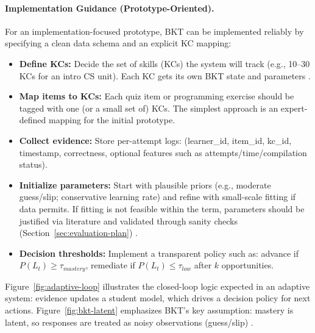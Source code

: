 \documentclass{article}
\begin{document}
\paragraph{Implementation Guidance (Prototype-Oriented).}
For an implementation-focused prototype, BKT can be implemented reliably by specifying a clean data schema
and an explicit KC mapping:
\begin{itemize}
    \item \textbf{Define KCs:} Decide the set of skills (KCs) the system will track (e.g., 10--30 KCs for an
    intro CS unit). Each KC gets its own BKT state and parameters \cite{corbett1995}.
    \item \textbf{Map items to KCs:} Each quiz item or programming exercise should be tagged with one (or a small
    set of) KCs. The simplest approach is an expert-defined mapping for the initial prototype.
    \item \textbf{Collect evidence:} Store per-attempt logs: (learner\_id, item\_id, kc\_id, timestamp, correctness,
    optional features such as attempts/time/compilation status).
    \item \textbf{Initialize parameters:} Start with plausible priors (e.g., moderate guess/slip; conservative learning
    rate) and refine with small-scale fitting if data permits. If fitting is not feasible within the term, parameters
    should be justified via literature and validated through sanity checks (Section~\ref{sec:evaluation-plan}) \cite{vandesande2013}.
    \item \textbf{Decision thresholds:} Implement a transparent policy such as:
    advance if $P(L_t) \ge \tau_{mastery}$, remediate if $P(L_t) \le \tau_{low}$ after $k$ opportunities.
\end{itemize}

Figure~\ref{fig:adaptive-loop} illustrates the closed-loop logic expected in an adaptive system: evidence updates
a student model, which drives a decision policy for next actions. Figure~\ref{fig:bkt-latent} emphasizes BKT’s key
assumption: mastery is latent, so responses are treated as noisy observations (guess/slip) \cite{corbett1995}.
\end{document}
